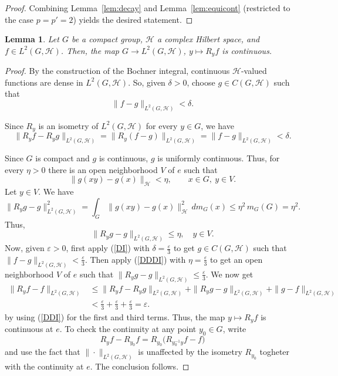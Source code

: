 \documentclass[11pt]{amsart}
\newtheorem{lemma}[theorem]{Lemma}
\begin{document}
\begin{proof}
 Combining Lemma~\ref{lem:decay}  and  Lemma~\ref{lem:equicont} (restricted  to the case $p=p'=2$)  yields the desired statement.
\end{proof}

\begin{lemma}\label{lemma:translation-continuous}
Let $G$ be a compact group, $\mathcal{H}$ a complex Hilbert space, and $f\in L^2(G,\mathcal{H})$.
Then, the map $G\to L^2(G,\mathcal{H})$, $y\mapsto R_yf$ is continuous. 
\end{lemma}

\begin{proof}
By the construction of the Bochner integral,  continuous $\mathcal{H}$-valued functions are dense
in $L^2(G,\mathcal{H})$. So, given $\delta>0$, choose $g\in C(G,\mathcal{H})$ such that
\begin{equation}\label{DI}
\|f-g\|_{L^2(G,\mathcal{H})}<\delta.
\end{equation}

Since  $R_y$ is an isometry of $L^2(G,\mathcal{H})$ for every $y\in G$,  we have
\begin{equation}\label{DDI}
\|R_yf-R_yg\|_{L^2(G,\mathcal{H})}=\|R_y(f-g)\|_{L^2(G,\mathcal{H})}=\|f-g\|_{L^2(G,\mathcal{H})}<\delta.
\end{equation}



Since $G$ is compact and $g$ is continuous, $g$ is uniformly continuous. Thus, for every
$\eta>0$ there is an open neighborhood $V$ of $e$ such that
$$
\|g(xy)-g(x)\|_\mathcal{H}<\eta,\qquad x\in G,\ y\in V.
$$
 Let  $y\in V$. We have
$$
\|R_yg-g\|_{L^2(G,\mathcal{H})}^2=\int_G\|g(xy)-g(x)\|_\mathcal{H}^2\,dm_G(x)\le\eta^2\,m_G(G)=\eta^2.
$$
Thus, 
\begin{equation}\label{DDDI}
\|R_yg-g\|_{L^2(G,\mathcal{H})}\le\eta,\quad
y\in V.
\end{equation}
Now,  given $\varepsilon>0$, first
apply  (\ref{DI}) with $\delta=\frac{\varepsilon}{3}$ to get $g\in C(G,\mathcal{H})$ such that
$\|f-g\|_{L^2(G,\mathcal{H})}<\frac{\varepsilon}{3}$. Then apply (\ref{DDDI}) with $\eta=\frac{\varepsilon}{3}$ to
get an open neighborhood $V$ of $e$ such that $\|R_yg-g\|_{L^2(G,\mathcal{H})}\le\frac{\varepsilon}{3}$. We now get
\begin{align*}
\|R_yf-f\|_{L^2(G,\mathcal{H})}&\le\|R_yf-R_yg\|_{L^2(G,\mathcal{H})}+\|R_yg-g\|_{L^2(G,\mathcal{H})}+
\|g-f\|_{L^2(G,\mathcal{H})}\\
&<\frac{\varepsilon}{3}+\frac{\varepsilon}{3}+\frac{\varepsilon}{3}=\varepsilon.
\end{align*}
by using (\ref{DDI}) for the first and third terms.
Thus, the map $y\mapsto R_yf$ is continuous at $e$. To check the continuity at any point $y_0\in G$, write
$$R_yf-R_{y_0}f=R_{y_0}\big(R_{y_0^{-1}y}f-f\big)$$
and  use the fact that $\|\cdot\|_{L^2(G,\mathcal{H})}$
is unaffected by the isometry $R_{y_0}$ togheter with the continuity at $e$. The conclusion follows.
\end{proof}
\end{document}
